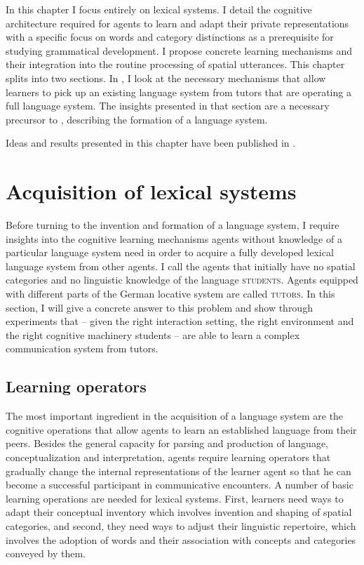 In this chapter I focus entirely on lexical systems. 
I detail the cognitive architecture required for agents to learn 
and adapt their private representations with a specific
focus on words and category distinctions as a prerequisite 
for studying grammatical development. I propose concrete 
learning mechanisms and their integration into the
routine processing of spatial utterances. This chapter splits into 
two sections. In , I look at the necessary mechanisms that allow 
learners to pick up an existing language system from tutors that 
are operating a full language system. The insights presented in 
that section are a necessary precursor to ,
describing the formation of a language system. 

Ideas and results presented in this chapter have been 
published in \citep{spranger2012basic,spranger2013acquisition}.

\section{Acquisition of lexical systems}
\label{s:category-acquisition}
Before turning to the invention and formation of a language system, I require
insights into the cognitive learning mechanisms agents without knowledge 
of a particular language system need in order to acquire a fully developed lexical language
system from other agents. I call the agents that initially have no spatial categories
and no linguistic knowledge of the language \textsc{students}. Agents
equipped with different parts of the German locative system are called \textsc{tutors}.
In this section, I will give a concrete answer to this 
problem and show through experiments that -- given the right interaction setting,
the right environment and the right cognitive machinery students -- are able to learn 
a complex communication system from tutors.

\subsection{Learning operators}
The most important ingredient in the acquisition of a language system are
the cognitive operations that allow agents to learn an established language
from their peers. Besides the general capacity for parsing and production 
of language, conceptualization and interpretation, 
agents require learning operators that gradually change
the internal representations of the learner agent so that he can become a 
successful participant in communicative encounters. A number of basic learning
operations are needed for lexical systems. First, learners need ways to adapt
their conceptual inventory which involves invention and shaping of spatial categories, 
and second, they need ways to adjust their linguistic repertoire, which involves 
the adoption of words and their association with concepts and categories 
conveyed by them. 

